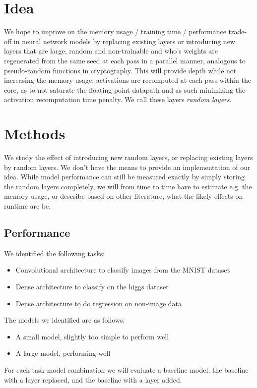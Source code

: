 \documentclass[]{article}
\begin{document}
\begin{multicols}{2}
	\section{Idea}
	We hope to improve on the memory usage / training time / performance trade-off in neural network models by replacing existing layers or introducing new layers that are large, random and non-trainable and who's weights are regenerated from the same seed at each pass in a parallel manner, analogous to pseudo-random functions in cryptography. This will provide depth while not increasing the memory usage; activations are recomputed at each pass within the core, as to not saturate the floating point datapath and as such minimizing the activation recomputation time penalty. We call these layers \emph{random layers}.
	
	\section{Methods}
	We study the effect of introducing new random layers, or replacing existing layers by random layers. We don't have the means to provide an implementation of our idea. While model performance can still be measured exactly by simply storing the random layers completely, we will from time to time have to estimate e.g. the memory usage, or describe based on other literature, what the likely effects on runtime are be.
	
	\subsection{Performance}
	We identified the following tasks:
	\begin{itemize}
		\item Convolutional architecture to classify images from the MNIST dataset
		\item Dense architecture to classify on the higgs dataset
		\item Dense architecture to do regression on non-image data %
	\end{itemize}
	The models we identified are as follows:
	\begin{itemize}
		\item A small model, slightly too simple to perform well
		\item A large model, performing well
	\end{itemize}
	For each task-model combination we will evaluate a baseline model, the baseline with a layer replaced, and the baseline with a layer added.
	

\end{multicols}
\end{document}
